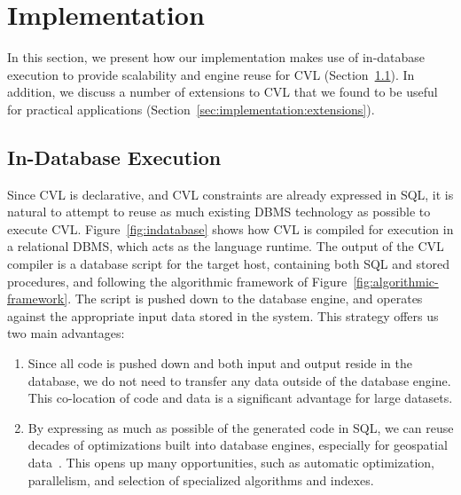 
\section{Implementation}
\label{sec:implementation}

In this section, we present how our implementation makes use of in-database execution to provide scalability and engine reuse for CVL (Section~\ref{sec:implementation:indatabase}). In addition, we discuss a number of extensions to CVL that we found to be useful for practical applications (Section~\ref{sec:implementation:extensions}). 

\subsection{In-Database Execution}
\label{sec:implementation:indatabase}

Since CVL is declarative, and CVL constraints are already expressed in SQL, it is natural to attempt to reuse as much existing DBMS technology as possible to execute CVL. Figure~\ref{fig:indatabase} shows how CVL is compiled for execution in a relational DBMS, which acts as the language runtime. The output of the CVL compiler is a database script for the target host, containing both SQL and stored procedures, and following the algorithmic framework of Figure~\ref{fig:algorithmic-framework}. The script is pushed down to the database engine, and operates against the appropriate input data stored in the system. This strategy offers us two main advantages:

\begin{enumerate}

\item Since all code is pushed down and both input and output reside in the database, we do not need to transfer any data outside of the database engine. This co-location of code and data is a significant advantage for large datasets.

\item By expressing as much as possible of the generated code in SQL, we can reuse decades of optimizations built into database engines, especially for geospatial data~\cite{Guttman1984:RTree,gist}. This opens up many opportunities, such as automatic optimization, parallelism, and selection of specialized algorithms and indexes.  

\end{enumerate} 

